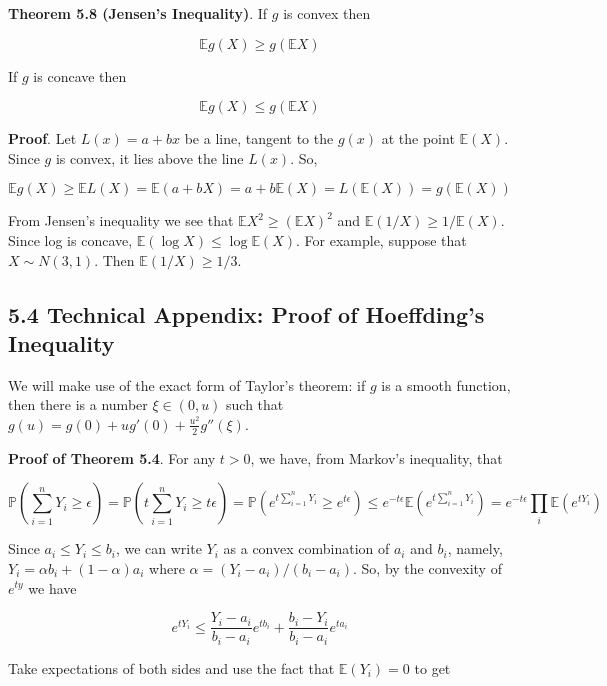 \textbf{Theorem 5.8 (Jensen's Inequality)}. If \(g\) is convex then

\[ \mathbb{E}g(X) \geq g(\mathbb{E}X) \]

If \(g\) is concave then

\[ \mathbb{E}g(X) \leq g(\mathbb{E}X) \]

\textbf{Proof}. Let \(L(x) = a + bx\) be a line, tangent to the \(g(x)\)
at the point \(\mathbb{E}(X)\). Since \(g\) is convex, it lies above the
line \(L(x)\). So,

\[ \mathbb{E}g(X) \geq \mathbb{E}L(X) = \mathbb{E}(a + bX) = a + b\mathbb{E}(X) = L(\mathbb{E}(X)) = g(\mathbb{E}(X))\]

From Jensen's inequality we see that
\(\mathbb{E}X^2 \geq (\mathbb{E}X)^2\) and
\(\mathbb{E}(1/X) \geq 1 / \mathbb{E}(X)\). Since log is concave,
\(\mathbb{E}(\log X) \leq \log \mathbb{E}(X)\). For example, suppose
that \(X \sim N(3, 1)\). Then \(\mathbb{E}(1 / X) \geq 1/3\).

\subsection{5.4 Technical Appendix: Proof of Hoeffding's
Inequality}\label{technical-appendix-proof-of-hoeffdings-inequality}

We will make use of the exact form of Taylor's theorem: if \(g\) is a
smooth function, then there is a number \(\xi \in (0, u)\) such that
\(g(u) = g(0) + u g'(0) + \frac{u^2}{2}g''(\xi)\).

\textbf{Proof of Theorem 5.4}. For any \(t > 0\), we have, from Markov's
inequality, that

\[ \mathbb{P}\left( \sum_{i=1}^n Y_i \geq \epsilon \right) = \mathbb{P}\left( t \sum_{i=1}^n Y_i \geq t \epsilon \right)
= \mathbb{P}\left( e^{t \sum_{i=1}^n Y_i} \geq e^{t \epsilon} \right) \leq e^{-t\epsilon} \mathbb{E}\left( e^{t \sum_{i=1}^n Y_i}\right) = e^{-t\epsilon} \prod_i \mathbb{E}\left(e^{tY_i}\right) \]

Since \(a_i \leq Y_i \leq b_i\), we can write \(Y_i\) as a convex
combination of \(a_i\) and \(b_i\), namely,
\(Y_i = \alpha b_i + (1 - \alpha) a_i\) where
\(\alpha = (Y_i - a_i) / (b_i - a_i)\). So, by the convexity of
\(e^{ty}\) we have

\[ e^{tY_i} \leq \frac{Y_i - a_i}{b_i - a_i} e^{tb_i} + \frac{b_i - Y_i}{b_i - a_i} e^{ta_i} \]

Take expectations of both sides and use the fact that
\(\mathbb{E}(Y_i) = 0\) to get

